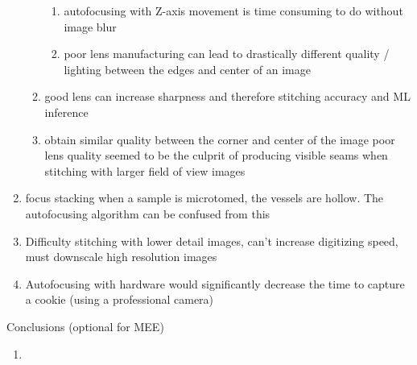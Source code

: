 \documentclass{article}
\begin{document}
\begin{outline}[enumerate]
\begin{enumerate}
\begin{enumerate}
\begin{enumerate}
				\item autofocusing with Z-axis movement is time consuming to do without image blur
				\item poor lens manufacturing can lead to drastically different quality / lighting between the edges and center of an image
				\end{enumerate}
			\item good lens can increase sharpness and therefore stitching accuracy and ML inference
			\item obtain similar quality between the corner and center of the image
			\subitem poor lens quality seemed to be the culprit of producing visible seams when stitching with larger field of view images 
			\end{enumerate}

		\item focus stacking
		\subitem when a sample is microtomed, the vessels are hollow. The autofocusing algorithm can be confused from this 
		\item Difficulty stitching with lower detail images, can't increase digitizing speed, must downscale high resolution images 
		\item Autofocusing with hardware would significantly decrease the time to capture a cookie (using a professional camera)
	\end{enumerate}
\item Conclusions (optional for MEE)
	\begin{enumerate}
	\item
	\end{enumerate}
        
\end{outline}
\end{document}
